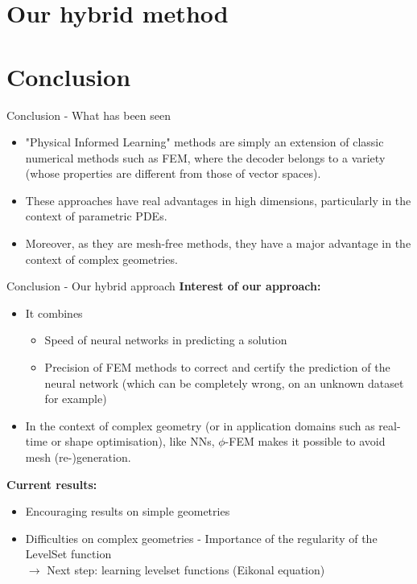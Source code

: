 \documentclass[compress,10pt,xcolor={table,dvipsnames},t]{beamer}
\newcommand{\refappendix}[1]{\tikz[baseline=(char.base)]{\node[framednumber] (char) {\hyperlink{#1}{\small \textcolor{white}{Appendix \ref*{#1}}}};}}
\begin{document}
	\section{Our hybrid method}
	
	
	\section{Conclusion} %
	
	\begin{frame}{Conclusion - What has been seen }
		\begin{itemize}[\textbullet]
			\item "Physical Informed Learning" methods are simply an extension of classic numerical methods such as FEM, where the decoder belongs to a variety (whose properties are different from those of vector spaces).
			\item These approaches have real advantages in high dimensions, particularly in the context of parametric PDEs.
			\item Moreover, as they are mesh-free methods, they have a major advantage in the context of complex geometries.
		\end{itemize}
	\end{frame}

	\begin{frame}[label={lastslide}]{Conclusion - Our hybrid approach}
		\textbf{Interest of our approach:} 
		\begin{itemize}[\textbullet]
			\item It combines
			\begin{itemize}[]
				\item Speed of neural networks in predicting a solution
				\item Precision of FEM methods to correct and certify the prediction of the neural network (which can be completely wrong, on an unknown dataset for example)
			\end{itemize}
			\item In the context of complex geometry (or in application domains such as real-time or shape optimisation), like NNs, $\phi$-FEM makes it possible to avoid mesh (re-)generation.
		\end{itemize}
		
		\textbf{Current results:}
		\begin{itemize}[\textbullet]
			\item Encouraging results on simple geometries \refappendix{frame:results}
			\item Difficulties on complex geometries - Importance of the regularity of the LevelSet function \\
			$\rightarrow$ Next step: learning levelset functions (Eikonal equation)
		\end{itemize}
	\end{frame}
\end{document}
